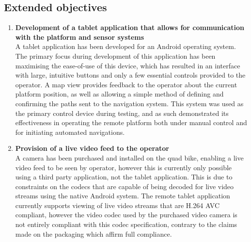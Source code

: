 \documentclass[main.tex]{subfiles}
\begin{document}
\subsection{Extended objectives}
\begin{enumerate}
\item \textbf{Development of a tablet application that allows for communication with the platform and sensor systems}\\ 
A tablet application has been developed for an Android operating system. The primary focus during development of this application has been maximising the ease-of-use of this device, which has resulted in an interface with large, intuitive buttons and only a few essential controls provided to the operator. 
A map view provides feedback to the operator about the current platform position, as well as allowing a simple method of defining and confirming the paths sent to the navigation system.
This system was used as the primary control device during testing, and as such demonstrated its effectiveness in operating the remote platform both under manual control and for initiating automated navigations. 



\item \textbf{Provision of a live video feed to the operator}\\ 
A camera has been purchased and installed on the quad bike, enabling a live video feed to be seen by operator, however this is currently only possible using a third party application, not the tablet application.
This is due to constraints on the codecs that are capable of being decoded for live video streams using the native Android system. The remote tablet application currently supports viewing of live video streams that are H.264 AVC compliant, however the video codec used by the purchased video camera is not entirely compliant with this codec specification, contrary to the claims made on the packaging which affirm full compliance.


\end{enumerate}
\end{document}
